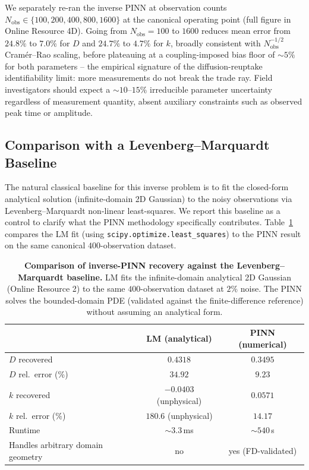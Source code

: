 \documentclass[12pt]{article}
\begin{document}
We separately re-ran the inverse PINN at observation counts
$N_{\mathrm{obs}} \in \{100, 200, 400, 800, 1600\}$ at the
canonical operating point (full figure in Online Resource 4D).
Going from $N_{\mathrm{obs}}=100$ to $1600$ reduces mean error
from $24.8\%$ to $7.0\%$ for $D$ and $24.7\%$ to $4.7\%$ for
$k$, broadly consistent with $N_{\mathrm{obs}}^{-1/2}$
Cram\'er--Rao scaling, before plateauing at a coupling-imposed
bias floor of $\sim 5\%$ for both parameters -- the empirical
signature of the diffusion-reuptake identifiability limit: more
measurements do not break the trade ray. Field investigators
should expect a $\sim 10$--$15\%$ irreducible parameter
uncertainty regardless of measurement quantity, absent auxiliary
constraints such as observed peak time or amplitude.

\subsection{Comparison with a Levenberg--Marquardt Baseline}
\label{sec:res_lm_baseline}

The natural classical baseline for this inverse problem is to fit the
closed-form analytical solution (infinite-domain 2D Gaussian) to the
noisy observations via Levenberg--Marquardt non-linear least-squares.
We report this baseline as a control to clarify what the PINN
methodology specifically contributes. Table~\ref{tab:lm_baseline}
compares the LM fit (using \texttt{scipy.optimize.least\_squares}) to
the PINN result on the same canonical $400$-observation dataset.

\begin{table}[h!]
\centering
\caption{\textbf{Comparison of inverse-PINN recovery against the
Levenberg--Marquardt baseline.}
LM fits the infinite-domain analytical 2D Gaussian
(Online Resource 2) to the same $400$-observation dataset
at $2\%$ noise. The PINN solves the bounded-domain PDE (validated
against the finite-difference reference) without assuming an analytical
form.}
\label{tab:lm_baseline}
\begin{tabular}{lcc}
\toprule
                                   & \textbf{LM (analytical)} & \textbf{PINN (numerical)} \\
\midrule
$D$ recovered                      & $0.4318$                 & $0.3495$                  \\
$D$ rel.\ error (\%)               & $34.92$                  & $9.23$                    \\
$k$ recovered                      & $-0.0403$ (unphysical)   & $0.0571$                  \\
$k$ rel.\ error (\%)               & $180.6$ (unphysical)     & $14.17$                   \\
Runtime                            & $\sim 3.3$\,ms           & $\sim 540$\,s             \\
Handles arbitrary domain geometry  & no                       & yes (FD-validated)        \\
\bottomrule
\end{tabular}
\end{table}
\end{document}
